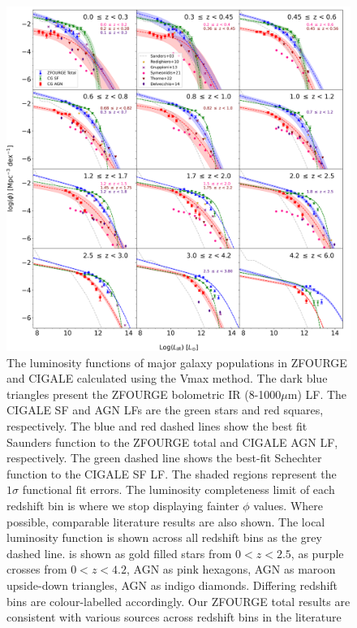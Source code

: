 \begin{figure}
    \centering
    \includegraphics[width=\textwidth]{Figures/LF.png}
    \caption{The luminosity functions of major galaxy populations in ZFOURGE and CIGALE calculated using the Vmax method. The dark blue triangles present the ZFOURGE bolometric IR (8-1000$\mu$m) LF. The CIGALE SF and AGN LFs are the green stars and red squares, respectively. The blue and red dashed lines show the best fit Saunders function \citep{saunders_60-mum_1990} to the ZFOURGE total and CIGALE AGN LF, respectively. The green dashed line shows the best-fit Schechter function \citep{schechter_analytic_1976} to the CIGALE SF LF. The shaded regions represent the $1\sigma$ functional fit errors. The luminosity completeness limit of each redshift bin is where we stop displaying fainter $\phi$ values. Where possible, comparable literature results are also shown. The local \cite{sanders_iras_2003} luminosity function is shown across all redshift bins as the grey dashed line. \cite{rodighiero_mid-_2010} is shown as gold filled stars from $0 < z < 2.5$, \cite{gruppioni_herschel_2013} as purple crosses from $0 < z < 4.2$, \cite{symeonidis_agn_2021} AGN as pink hexagons, \cite{thorne_deep_2022} AGN as maroon upside-down triangles, \cite{delvecchio_tracing_2014} AGN as indigo diamonds. Differing redshift bins are colour-labelled accordingly. Our ZFOURGE total results are consistent with various sources across redshift bins in the literature \citep{fu_decomposing_2010, caputi_infrared_2007, huang_local_2007}}
    \label{Fig: Bolometric IR LF}
\end{figure}

